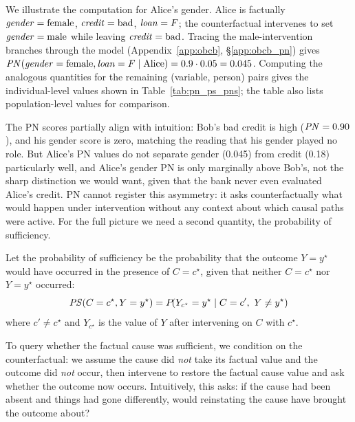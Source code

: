 We illustrate the computation for Alice's gender. Alice is factually
$\varname{gender}=\text{female}$, $\varname{credit}=\text{bad}$,
$\varname{loan}=F$; the counterfactual intervenes to set
$\varname{gender}=\text{male}$ while leaving $\varname{credit}=\text{bad}$.
Tracing the male-intervention branches through the model
(Appendix~\ref{app:obcb}, \S\ref{app:obcb_pn}) gives
$\pn(\varname{gender}=\text{female}, \varname{loan}=F \mid \text{Alice})
= 0.9 \cdot 0.05 = 0.045$.
Computing the analogous quantities for the remaining (variable, person) pairs gives
the individual-level values shown in Table~\ref{tab:pn_ps_pns}; the table also lists
population-level values for comparison.

The PN scores partially align with intuition: Bob's bad credit is high
($\mathit{PN}=0.90$), and his gender score is zero, matching the reading that his gender played
no role.
But Alice's PN values do not separate gender (0.045) from credit (0.18)
particularly well, and Alice's gender PN is only marginally above Bob's, not the
sharp distinction we would want, given that the bank never even evaluated Alice's
credit.
PN cannot register this asymmetry: it asks counterfactually what would happen
under intervention without any context about which causal paths were active.
For the full picture we need a second quantity, the probability of sufficiency.

\begin{definition}
Let the probability of sufficiency be the probability that the outcome $Y=y^\star$ would have occurred in the presence of $C = c^\star$, given that neither $C=c^\star$ nor $Y=y^\star$ occurred:
\[\mathit{PS}(C = c^{\star}, Y = y^\star) =  P\!(Y_{c^\star} = y^\star \;\vert\;  C = c',\ Y \neq y^\star)\]
where $c' \neq c^\star$ and $Y_{c^{\star}}$ is the value of $Y$ after intervening on $C$ with $c^\star$.
\end{definition}

To query whether the factual cause was sufficient, we condition on the counterfactual: we assume the cause did \emph{not} take its factual value and the outcome did \emph{not} occur, then intervene to restore the factual cause value and ask whether the outcome now occurs.
Intuitively, this asks: if the cause had been absent and things had gone differently, would reinstating the cause have brought the outcome about?

